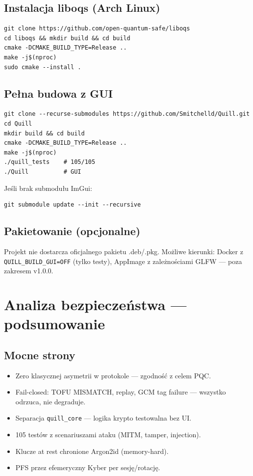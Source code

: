 \documentclass[12pt,a4paper]{article}
\begin{document}
\subsection{Instalacja liboqs (Arch Linux)}

\begin{lstlisting}[style=bash]
git clone https://github.com/open-quantum-safe/liboqs
cd liboqs && mkdir build && cd build
cmake -DCMAKE_BUILD_TYPE=Release ..
make -j$(nproc)
sudo cmake --install .
\end{lstlisting}

\subsection{Pełna budowa z GUI}

\begin{lstlisting}[style=bash]
git clone --recurse-submodules https://github.com/Smitchelld/Quill.git
cd Quill
mkdir build && cd build
cmake -DCMAKE_BUILD_TYPE=Release ..
make -j$(nproc)
./quill_tests    # 105/105
./Quill          # GUI
\end{lstlisting}

Jeśli brak submodułu ImGui:
\begin{lstlisting}[style=bash]
git submodule update --init --recursive
\end{lstlisting}

\subsection{Pakietowanie (opcjonalne)}

Projekt nie dostarcza oficjalnego pakietu .deb/.pkg. Możliwe kierunki: Docker z \texttt{QUILL\_BUILD\_GUI=OFF} (tylko testy), AppImage z zależnościami GLFW --- poza zakresem v1.0.0.

\section{Analiza bezpieczeństwa --- podsumowanie}

\subsection{Mocne strony}

\begin{itemize}
    \item Zero klasycznej asymetrii w protokole --- zgodność z celem PQC.
    \item Fail-closed: TOFU MISMATCH, replay, GCM tag failure --- wszystko odrzuca, nie degraduje.
    \item Separacja \texttt{quill\_core} --- logika krypto testowalna bez UI.
    \item 105 testów z scenariuszami ataku (MITM, tamper, injection).
    \item Klucze at rest chronione Argon2id (memory-hard).
    \item PFS przez efemeryczny Kyber per sesję/rotację.
\end{itemize}
\end{document}
